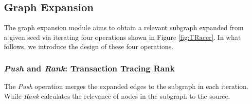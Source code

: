 \subsection{Graph Expansion}
The graph expansion module aims to obtain a relevant subgraph expanded from a given seed via iterating four operations shown in Figure \ref{fig:TRacer}. In what follows, we introduce the design of these four operations.
\subsubsection{\textit{Push} and \textit{Rank}: Transaction Tracing Rank}
The \textit{Push} operation merges the expanded edges to the subgraph in each iteration. While \textit{Rank} calculates the relevance of nodes in the subgraph to the source.


